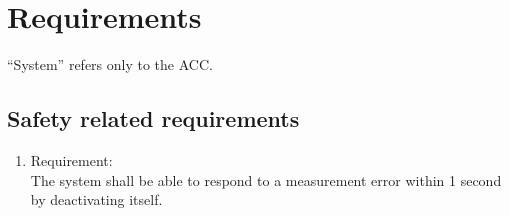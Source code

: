 \section{Requirements}
\label{chapter6}

“System” refers only to the ACC.

\subsection{Safety related requirements}

 \begin{enumerate}[label*=\arabic*.]
 	\item \label{req.1}  Requirement: \\
	 	The system shall be able to respond to a measurement error within 1 second by deactivating itself.  \\


\end{enumerate}
